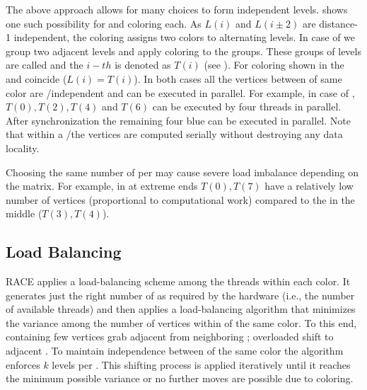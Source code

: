 The above approach allows for many choices to form \DK independent levels.  shows 
one such possibility for \DONE and \DTWO coloring each. As $L(i)$ and $L(i\pm2)$ are
distance-1 independent, the \DONE coloring  assigns
two colors to alternating levels.  In case of \DTWO we group two adjacent levels and apply \DONE
coloring to the groups. These groups of levels are called \levelGroups
 and the $i-th$ \levelGroup is denoted as $T(i)$ (see ).
For \DONE coloring shown in  the \levels and \levelGroups
coincide ($L(i) = T(i)$).
In both cases
 all the vertices  between \levelGroups of same color
  are \DONE/\DTWO independent  and can be executed in parallel.
   For example, in case of \DTWO, \levelGroups $T(0), T(2), T(4)$
 and $T(6)$ can be executed by four threads in parallel. After synchronization the remaining 
 four blue \levelGroups can be executed in parallel. Note that
 within a \levelGroup/\level the vertices are computed serially without destroying
 any data locality.

Choosing the same number of \levels per \levelGroup may cause severe
load imbalance depending on the matrix. For example, in  
 \levelGroups at extreme ends $T(0), T(7)$  have a relatively low number of 
 vertices (proportional to computational work)  compared to the \levelGroups 
 in the middle ($T(3),T(4)$).


\subsection{Load Balancing}
\Acrshort{RACE} applies a load-balancing scheme 
among the threads within each color.
It generates just the right number of \levelGroups 
as required by the hardware (i.e., the number of available threads)
and then applies a load-balancing algorithm that
minimizes the variance among the number of vertices 
within \levelGroups of the same color. To this end,
\levelGroups containing few vertices
grab adjacent \levels from neighboring \levelGroups; overloaded
\levelGroups shift \levels to adjacent \levelGroups. To maintain
\DK independence between \levelGroups of the same color the algorithm enforces \atleast $k$ levels per \levelGroup. This shifting process is applied iteratively until it
reaches the minimum possible variance or no further moves are possible due to
 \DK coloring.
 
